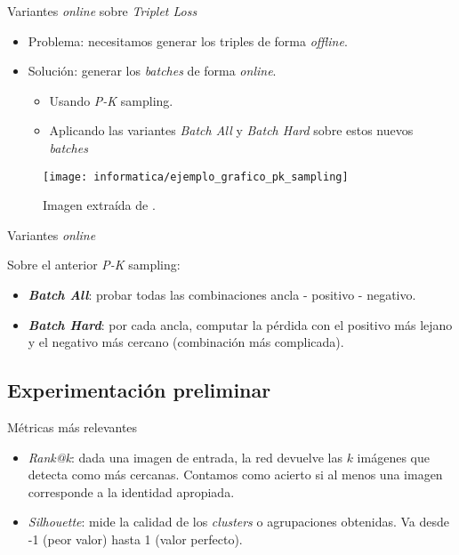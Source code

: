 \begin{frame}{Variantes \textit{online} sobre \textit{Triplet Loss}}

	\begin{itemize}
		\item Problema: necesitamos generar los triples de forma \textit{offline}.
		\item Solución: generar los \textit{batches} de forma \textit{online}.
		      \begin{itemize}
			      \item Usando \textit{P-K} sampling.
			      \item Aplicando las variantes \textit{Batch All} y \textit{Batch Hard} sobre estos nuevos \textit{batches}
		      \end{itemize}
	\end{itemize}

	\begin{figure}
		\texttt{[image: informatica/ejemplo\_grafico\_pk\_sampling]}
		\caption{Imagen extraída de \cite{informatica:paper_image_pk_sampling}.}
	\end{figure}

\end{frame}

\begin{frame}{Variantes \textit{online}}

	Sobre el anterior \textit{P-K} sampling:

	\begin{itemize}
		\item \textbf{\textit{Batch All}}: probar todas las combinaciones ancla - positivo - negativo.
		\item \textbf{\textit{Batch Hard}}: por cada ancla, computar la pérdida con el positivo más lejano y el negativo más cercano (combinación más complicada).
	\end{itemize}

\end{frame}

\subsection{Experimentación preliminar}
\begin{frame}{Métricas más relevantes}
	\begin{itemize}
		\item \textit{Rank@k}: dada una imagen de entrada, la red devuelve las $k$ imágenes que detecta como más cercanas. Contamos como acierto si al menos una imagen corresponde a la identidad apropiada.
		\item \textit{Silhouette}: mide la calidad de los \textit{clusters} o agrupaciones obtenidas. Va desde -1 (peor valor) hasta 1 (valor perfecto).
	\end{itemize}
\end{frame}

